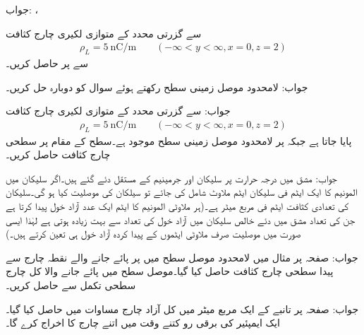 جواب: ، 


 سے گزرتی  محدد کے متوازی لکیری چارج کثافت
\begin{align*}
\rho_L=\SI{5}{\nano \coulomb \per \meter}  \quad \quad (-\infty < y < \infty, x=0,z=2)
\end{align*} 
سے  پر  حاصل کریں۔

جواب:
لامحدود موصل زمینی سطح   رکھتے ہوئے  سوال  کو دوبارہ حل کریں۔

جواب:
 سے گزرتی  محدد کے متوازی لکیری چارج کثافت
\begin{align*}
\rho_L=\SI{5}{\nano \coulomb \per \meter}  \quad \quad (-\infty < y < \infty, x=0,z=2)
\end{align*} 
پایا جاتا ہے جبکہ  پر لامحدود موصل زمینی سطح موجود ہے۔سطح کے  مقام پر سطحی چارج کثافت حاصل کریں۔

جواب: 
مشق  میں  درجہ حرارت پر  سلیکان اور جرمینیم کے مستقل دئے گئے ہیں۔اگر سلیکان میں المونیم کا ایک ایٹم فی   سلیکان ایٹم  ملاوٹ شامل کی جائے تو سیلکان کی موصلیت کیا ہو گی۔سلیکان کی تعدادی کثافت  ایٹم فی مربع میٹر ہے۔(ہر ملاوٹی المونیم کا  ایٹم ایک عدد آزاد خول پیدا کرتا ہے جن  کی تعداد مشق میں دئے خالص سلیکان میں آزاد خول کی تعداد سے بہت زیادہ ہوتی ہے لہٰذا ایسی صورت میں موصلیت صرف ملاوٹی ایٹموں کے پیدا کردہ آزاد خول ہی تعین کرتے ہیں۔) 

جواب: 
صفحہ  پر مثال  میں لامحدود موصل سطح  میں  پر پائے جانے والے نقطہ چارج  سے پیدا سطحی چارج کثافت  حاصل کیا گیا۔موصل سطح میں پائے جانے والا کل چارج سطحی تکمل سے حاصل کریں۔

جواب:  
صفحہ  پر تانبے کے ایک مربع میٹر میں کل آزاد چارج مساوات  میں حاصل کیا گیا۔ایک ایمپئیر کی برقی رو کتنے وقت میں اتنے چارج کا اخراج کرے گا۔

